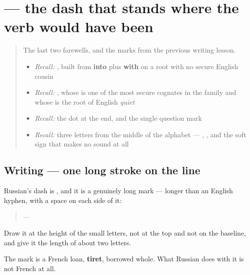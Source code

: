 \section[— (tire)]{— the dash that stands where the verb would have been}

\label{lesson:RU-W09-tire}



\begin{quote}
The last two farewells, and the marks from the previous writing lesson.

\begin{itemize}
\raggedright
  \item \emph{Recall:} \emph{ }, built from \textbf{into} plus \textbf{with} on a root with no secure English cousin
  \item \emph{Recall:} \emph{ }, whose \emph{} is one of the most secure cognates in the family and whose \emph{} is the root of English \emph{quiet}
  \item \emph{Recall:} the dot at the end, and the single question mark
  \item \emph{Recall:} three letters from the middle of the alphabet — \textbf{}, \textbf{}, and the soft sign that makes no sound at all
\end{itemize}
\end{quote}

\subsection*{Writing — one long stroke on the line}
Russian's dash is \textbf{}, and it is a genuinely long mark — longer than an English hyphen, with a space on each side of it:

\begin{quote}
 — 
\end{quote}

Draw it at the height of the small letters, not at the top and not on the baseline, and give it the length of about two letters.

The mark is a French loan, \textbf{tiret}, borrowed whole. What Russian does with it is not French at all.

